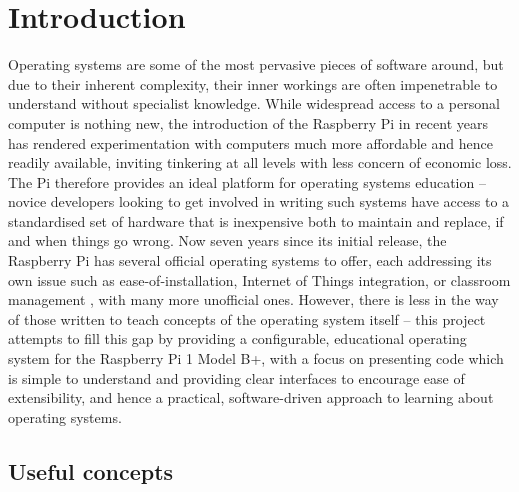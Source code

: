 \section{Introduction}
    Operating systems are some of the most pervasive pieces of software around,
    but due to their inherent complexity, their inner workings are often
    impenetrable to understand without specialist knowledge. While widespread
    access to a personal computer is nothing new, the introduction of the
    Raspberry Pi in recent years has rendered experimentation with computers
    much more affordable and hence readily available, inviting tinkering at all
    levels with less concern of economic loss. The Pi therefore provides an
    ideal platform for operating systems education -- novice developers looking
    to get involved in writing such systems have access to a standardised set of
    hardware that is inexpensive both to maintain and replace, if and when
    things go wrong. Now seven years since its initial release, the Raspberry
    Pi has several official operating systems to offer, each addressing its own
    issue such as ease-of-installation, Internet of Things integration, or
    classroom management \cite{OSes}, with many more unofficial ones. However,
    there is less in the way of those written to teach concepts of the operating
    system itself -- this project attempts to fill this gap by providing a
    configurable, educational operating system for the Raspberry Pi 1 Model B+,
    with a focus on presenting code which is simple to understand and providing
    clear interfaces to encourage ease of extensibility, and hence a practical,
    software-driven approach to learning about operating systems.

\subsection{Useful concepts}
